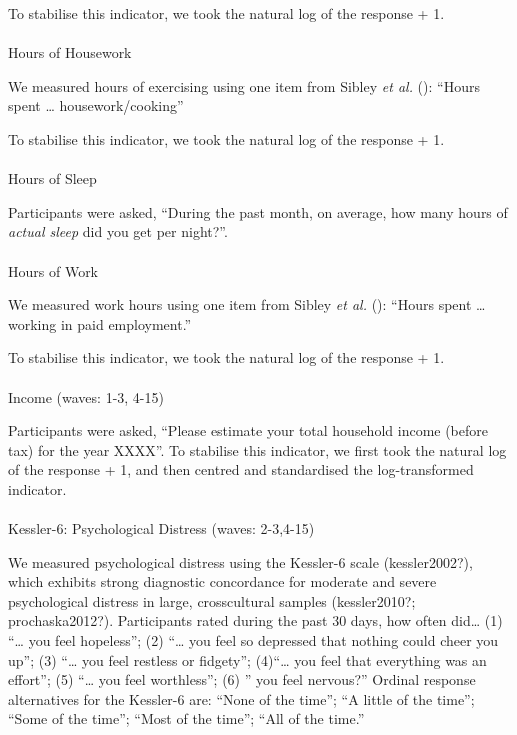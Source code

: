 \documentclass[
  single column]{article}
\makeatletter
\let\oldparagraph\paragraph
\renewcommand{\paragraph}{
    \@ifstar
      \xxxParagraphStar
      \xxxParagraphNoStar
  }
\newcommand{\xxxParagraphStar}[1]{\oldparagraph*{#1}\mbox{}}
\newcommand{\xxxParagraphNoStar}[1]{\oldparagraph{#1}\mbox{}}
\makeatother
\begin{document}
To stabilise this indicator, we took the natural log of the response +
1.

\paragraph{Hours of Housework}\label{hours-of-housework-1}

We measured hours of exercising using one item from Sibley \emph{et al.}
(): ``Hours spent \ldots{}
housework/cooking''

To stabilise this indicator, we took the natural log of the response +
1.

\paragraph{Hours of Sleep}\label{hours-of-sleep}

Participants were asked, ``During the past month, on average, how many
hours of \emph{actual sleep} did you get per night?''.

\paragraph{Hours of Work}\label{hours-of-work}

We measured work hours using one item from Sibley \emph{et al.}
(): ``Hours spent \ldots{} working in
paid employment.''

To stabilise this indicator, we took the natural log of the response +
1.

\paragraph{Income (waves: 1-3, 4-15)}\label{income-waves-1-3-4-15}

Participants were asked, ``Please estimate your total household income
(before tax) for the year XXXX''. To stabilise this indicator, we first
took the natural log of the response + 1, and then centred and
standardised the log-transformed indicator.

\paragraph{Kessler-6: Psychological Distress (waves:
2-3,4-15)}\label{kessler-6-psychological-distress-waves-2-34-15}

We measured psychological distress using the Kessler-6 scale
(kessler2002?), which exhibits strong diagnostic concordance for
moderate and severe psychological distress in large, crosscultural
samples (kessler2010?; prochaska2012?). Participants rated during the
past 30 days, how often did\ldots{} (1) ``\ldots{} you feel hopeless'';
(2) ``\ldots{} you feel so depressed that nothing could cheer you up'';
(3) ``\ldots{} you feel restless or fidgety''; (4)``\ldots{} you feel
that everything was an effort''; (5) ``\ldots{} you feel worthless'';
(6) '' you feel nervous?'' Ordinal response alternatives for the
Kessler-6 are: ``None of the time''; ``A little of the time''; ``Some of
the time''; ``Most of the time''; ``All of the time.''
\end{document}
